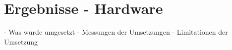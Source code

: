 \chapter{Ergebnisse - Hardware} \label{ergebnisse}

\nocite{*}
- Was wurde umgesetzt
- Messungen der Umsetzungen
- Limitationen der Umsetzung
